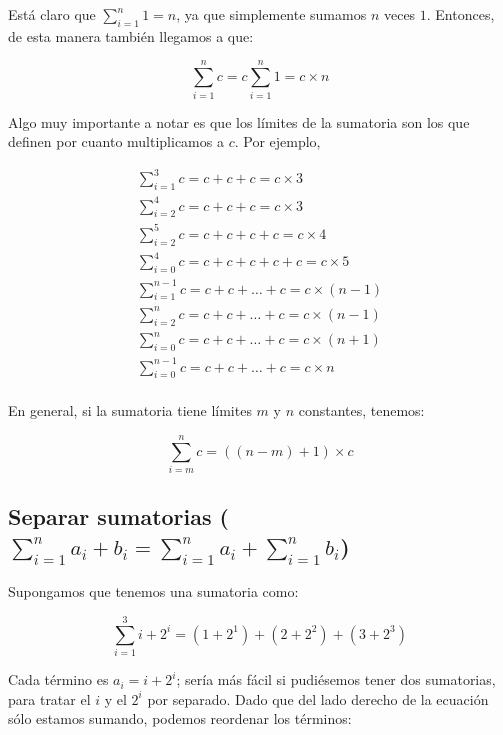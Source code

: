 Está claro que $\sum_{i=1}^{n}{1} =n$, ya que simplemente sumamos $n$ veces $1$. Entonces, de esta manera también llegamos a que:

\begin{equation*}
	\sum_{i=1}^{n}{c} = c \sum_{i=1}^{n}{1} = c \times n
\end{equation*}

Algo muy importante a notar es que los límites de la sumatoria son los que definen por cuanto multiplicamos a $c$. Por ejemplo,

\begin{gather*}
	\sum_{i=1}^{3}{c} =  c + c + c = c \times 3 \\
	\sum_{i=2}^{4}{c} =  c + c + c = c \times 3 \\
	\sum_{i=2}^{5}{c} =  c + c + c + c = c \times 4 \\
	\sum_{i=0}^{4}{c} =  c + c + c + c + c= c \times 5 \\
	\sum_{i=1}^{n-1}{c} =  c + c + \dots + c = c \times (n-1) \\
	\sum_{i=2}^{n}{c} =  c + c + \dots + c = c \times (n-1) \\
	\sum_{i=0}^{n}{c} =  c + c + \dots + c = c \times (n+1) \\
	\sum_{i=0}^{n-1}{c} =  c + c + \dots + c = c \times n \\
\end{gather*}

En general, si la sumatoria tiene límites $m$ y $n$ constantes, tenemos:

\begin{equation}
\sum_{i=m}^n{c} = ((n-m) +1) \times c
\end{equation}


\newcommand{\separar}{\sum_{i=1}^n{a_i+b_i}=\sum_{i=1}^n{ a_i} + \sum_{i=1}^n{b_i} }
\subsection{Separar sumatorias ($\separar$)}


Supongamos que tenemos una sumatoria como:

\begin{equation*}
\sum_{i=1}^3{i+2^i} = (1+2^1) + (2+2^2) + (3+2^3)
\end{equation*}

Cada término es $a_i=i+2^i$; sería más fácil si pudiésemos tener dos sumatorias, para tratar el $i$ y el $2^i$ por separado. Dado que del lado derecho de la ecuación sólo estamos sumando, podemos reordenar los términos:

